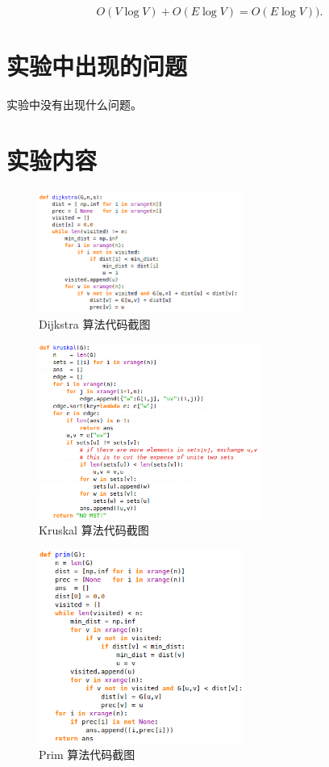 \documentclass[12pt]{article}
\begin{document}
$$ O(V\log{V})+O(E\log{V}) = O(E\log{V})) .$$

\section*{实验中出现的问题}
实验中没有出现什么问题。

\section*{实验内容}

\begin{figure}[H]
    \includegraphics[width=0.60\textwidth]{dijkstra_code.png}
    \caption{Dijkstra 算法代码截图}
\end{figure}

\begin{figure}[H]
    \includegraphics[width=0.65\textwidth]{kruskal_code.png}
    \caption{Kruskal 算法代码截图}
\end{figure}

\begin{figure}[H]
    \includegraphics[width=0.60\textwidth]{prim_code.png}
    \caption{Prim 算法代码截图}
\end{figure}
\end{document}
